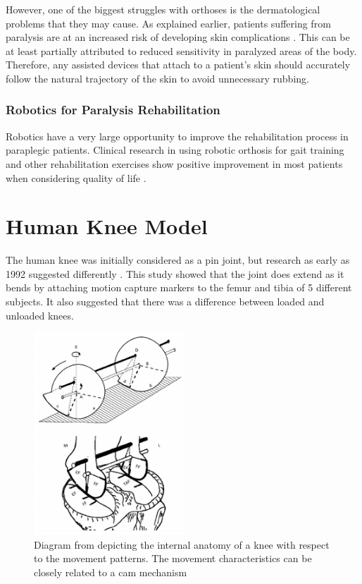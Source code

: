 However, one of the biggest struggles with orthoses is the dermatological problems that they may cause. As explained earlier, patients suffering from paralysis are at an increased risk of developing skin complications \cite{DermatologicalIssuesParalysis}. This can be at least partially attributed to reduced sensitivity in paralyzed areas of the body. Therefore, any assisted devices that attach to a patient's skin should accurately follow the natural trajectory of the skin to avoid unnecessary rubbing.

\subsubsection{Robotics for Paralysis Rehabilitation}
Robotics have a very large opportunity to improve the rehabilitation process in paraplegic patients. Clinical research in using robotic orthosis for gait training and other rehabilitation exercises show positive improvement in most patients when considering quality of life \cite{GaitTrainingBenefitsRoboticsWalkbot} \cite{RoboticGaitTraining}. 

\section{Human Knee Model}
\label{sec:KneeModel}

The human knee was initially considered as a pin joint, but research as early as 1992 suggested differently \cite{3DKinKneeJointOldStabby}. This study showed that the joint does extend as it bends by attaching motion capture markers to the femur and tibia of 5 different subjects. It also suggested that there was a difference between loaded and unloaded knees. 

\begin{figure}[ht!]
    \centering
    \includegraphics[width=0.5\textwidth]{Figures/Background/KneeAnatomy1.png}
    \caption{Diagram from \cite{MRIKneeShape_Unloaded} depicting the internal anatomy of a knee with respect to the movement patterns. The movement characteristics can be closely related to a cam mechanism}
    \label{fig:KneeAnatomyCam}
\end{figure}

